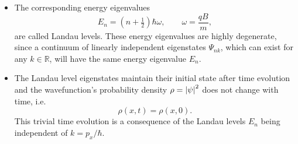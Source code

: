 \documentclass[11pt, a4paper]{article}
\newcommand{\p}{\psi}  %
\renewcommand{\P}{\Psi}  %
\begin{document}
\begin{itemize}
    \item The corresponding energy eigenvalues
	\begin{equation*}
        E_{n} = \left(n + \tfrac{1}{2}\right)\hbar \omega, \qquad \omega = \frac{qB}{m},
	\end{equation*}
	are called Landau levels. These energy eigenvalues are highly degenerate, since a continuum of linearly independent eigenstates $ \P_{nk} $, which can exist for any $ k \in \mathbb{R} $, will have the same energy eigenvalue $ E_{n} $. 

	\item The Landau level eigenstates maintain their initial state after time evolution and the wavefunction's probability density $ \rho = \abs{\p}^{2} $ does not change with time, i.e.
	\begin{equation*}
		\rho(x, t) = \rho(x, 0).
	\end{equation*}
    This trivial time evolution is a consequence of the Landau levels $ E_{n} $ being independent of $ k = p_{x}/\hbar $.

\end{itemize}
\end{document}

